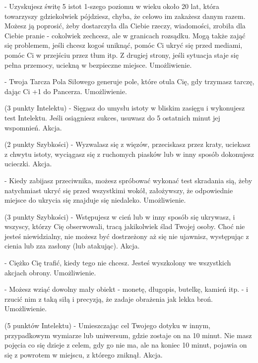 { - Uzyskujesz świtę 5 istot 1-szego poziomu w wieku około 20 lat, która towarzyszy gdziekolwiek pójdziesz, chyba, że celowo im zakażesz danym razem. Możesz ją poprosić, żeby dostarczyła dla Ciebie rzeczy, wiadomości, zrobiła dla Ciebie pranie - cokolwiek zechcesz, ale w granicach rozsądku. Mogą także zająć się problemem, jeśli chcesz kogoś uniknąć, pomóc Ci ukryć się przed mediami, pomóc Ci w przejściu przez tłum itp. Z drugiej strony, jeśli sytuacja staje się pełna przemocy, uciekną w bezpieczne miejsce. Umożliwienie. 

 - Twoja Tarcza Pola Siłowego generuje pole, które otula Cię, gdy trzymasz tarczę, dając Ci +1 do Pancerza. Umożliwienie.

 (3 punkty Intelektu) - Sięgasz do umysłu istoty w bliskim zasięgu i wykonujesz test Intelektu. Jeśli osiągniesz sukces, usuwasz do 5 ostatnich minut jej wspomnień. Akcja. 

 (2 punkty Szybkości) -  Wyzwalasz się z więzów, przeciskasz przez kraty, uciekasz z chwytu istoty, wyciągasz się z ruchomych piasków lub w inny sposób dokonujesz ucieczki. Akcja.

 - Kiedy zabijasz przeciwnika, możesz spróbować wykonać test skradania sią, żeby natychmiast ukryć się przed wszystkimi wokół, założywszy, że odpowiednie miejsce do ukrycia się znajduje się niedaleko. Umożliwienie. 

 (3 punkty Szybkości) - Wstępujesz w cień lub w inny sposób się ukrywasz, i wszyscy, którzy Cię obserwowali, tracą jakikolwiek ślad Twojej osoby. Choć nie jesteś niewidzialny, nie możesz być dostrzeżony aż się nie ujawnisz, występując z cienia lub zza zasłony (lub atakując). Akcja.

 - Ciężko Cię trafić, kiedy tego nie chcesz. Jesteś wyszkolony we wszystkich akcjach obrony. Umożliwienie. 

 - Możesz wziąć dowolny mały obiekt - monetę, długopis, butelkę, kamień itp. - i rzucić nim z taką siłą i precyzją, że zadaje obrażenia jak lekka broń. Umożliwienie.

 (5 punktów Intelektu) - Umieszczając cel Twojego dotyku w innym, przypadkowym wymiarze lub uniwersum, gdzie zostaje on na 10 minut. Nie masz pojęcia co się dzieje z celem, gdy go nie ma, ale na koniec 10 minut, pojawia on się z powrotem w miejscu, z którego zniknął. Akcja. 

}
